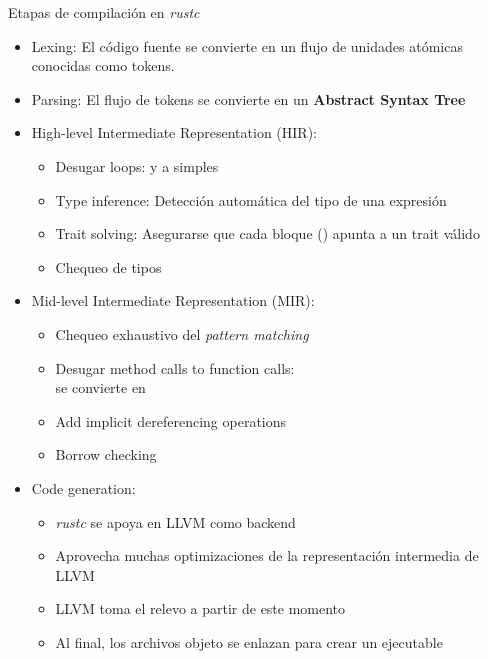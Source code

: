 \documentclass{beamer}
\begin{document}
\begin{frame}{Etapas de compilación en \emph{rustc}}
  \scriptsize

  \begin{itemize}
    \item Lexing: El código fuente se convierte en un flujo de unidades atómicas conocidas como tokens.
          \pause
    \item Parsing: El flujo de tokens se convierte en un \textbf{Abstract Syntax Tree}
          \pause
    \item High-level Intermediate Representation (HIR):
          \begin{itemize}
            \scriptsize
            [circle]
            \item Desugar loops:  y  a simples 
            \item Type inference: Detección automática del tipo de una expresión
            \item Trait solving: Asegurarse que cada bloque () apunta a un trait válido
            \item Chequeo de tipos
          \end{itemize}
          \pause
    \item Mid-level Intermediate Representation (MIR):
          \begin{itemize}
            \scriptsize
            [circle]
            \item Chequeo exhaustivo del \emph{pattern matching}
            \item Desugar method calls to function calls:\\
                   se convierte en 
            \item Add implicit dereferencing operations
            \item Borrow checking
          \end{itemize}
          \pause
    \item Code generation:
          \begin{itemize}
            \scriptsize
            [circle]
            \item \emph{rustc} se apoya en LLVM como backend
            \item Aprovecha muchas optimizaciones de la representación intermedia de LLVM
            \item LLVM toma el relevo a partir de este momento
            \item Al final, los archivos objeto se enlazan para crear un ejecutable
          \end{itemize}
  \end{itemize}
\end{frame}
\end{document}
